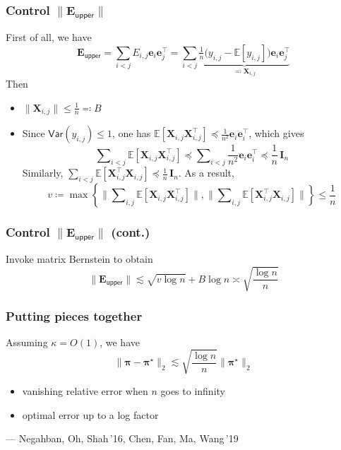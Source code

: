\documentclass[compress,
mathserif,wide,%
]{beamer}
\begin{document}
\begin{frame}
	\frametitle{Control $\|\bm{E}_{\mathsf{upper}}\|$}
	First of all, we have
	\[
	\bm{E}_{\mathsf{upper}} = \sum_{i < j} E_{i,j} \bm{e}_{i} \bm{e}_{j}^{\top} =\sum_{i < j} \underbrace{ \tfrac{1}{n} \big( y_{i,j}- \mathbb{E} [ y_{i,j}] \big) \bm{e}_{i} \bm{e}_{j}^{\top} }_{\eqqcolon \bm{X}_{i,j}}
	\]
	Then 
	\begin{itemize}
		\item $\|\bm{X}_{i,j}\| \leq \frac{1}{n} \eqqcolon B$
		\item Since $\mathsf{Var}(y_{i,j})\leq 1$, one has
$\mathbb{E}\left[\bm{X}_{i,j}\bm{X}_{i,j}^{\top}\right]\preceq \frac{1}{n^2} \bm{e}_{i}\bm{e}_{i}^{\top}$, which gives
%
\[
\sum\nolimits_{i < j}\mathbb{E}\left[\bm{X}_{i,j}\bm{X}_{i,j}^{\top}\right]\preceq\sum\nolimits_{i<j} \frac{1}{n^2} \bm{e}_{i}\bm{e}_{i}^{\top} \preceq \frac{1}{n}\,\bm{I}_{n}
\]
%
Similarly, $\sum_{i<j}\mathbb{E}\left[ \bm{X}_{i,j}^{\top} \bm{X}_{i,j} \right]\preceq \frac{1}{n}\,\bm{I}_{n}$.
As a result,
%
\[
v \coloneqq \max\left\{ \Big\|\sum\nolimits_{i,j}\mathbb{E}\left[\bm{X}_{i,j}\bm{X}_{i,j}^{\top}\right]\Big\|,\Big\|\sum\nolimits_{i,j}\mathbb{E}\left[\bm{X}_{i,j}^{\top}\bm{X}_{i,j}\right]\Big\|\right\} \leq \frac{1}{n}
\]

	\end{itemize}
\end{frame}

\begin{frame}
	\frametitle{Control $\|\bm{E}_{\mathsf{upper}}\|$ (cont.)}
	Invoke matrix Bernstein to obtain
	\[
	\|\bm{E}_{\mathsf{upper}}\| \lesssim \sqrt{v \log n} + B \log n \asymp \sqrt{\frac{\log n}{n}}
	\] 
\end{frame}

\begin{frame}
	\frametitle{Putting pieces together}
	Assuming $\kappa = O(1)$, we have
	\[
	\|\bm{\pi}-\bm{\pi}^{\star}\|_{2} \lesssim \sqrt{\frac{\log n}{n}} \|\bm{\pi}^{\star}\|_{2}
	\]
	\begin{itemize}
		\item vanishing relative error when $n$ goes to infinity
		\item optimal error up to a log factor 
	\end{itemize}
	
	\vfill 	
	\hfill --- {\small Negahban, Oh, Shah\,'16, Chen, Fan, Ma, Wang\,'19}
\end{frame}
\end{document}
